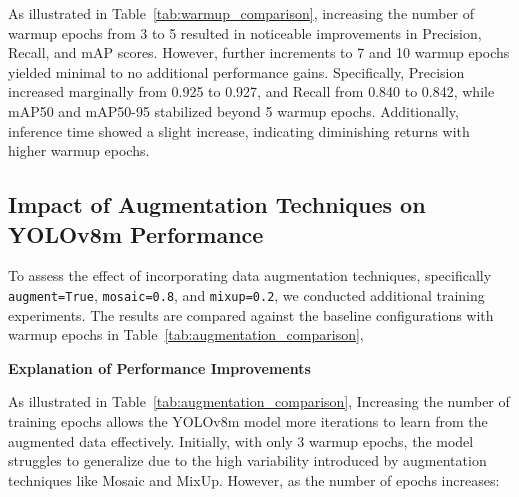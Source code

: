 \documentclass[conference]{IEEEtran}
\begin{document}
\vspace{0.5em} %

As illustrated in Table~\ref{tab:warmup_comparison}, increasing the number of warmup epochs from 3 to 5 resulted in noticeable improvements in Precision, Recall, and mAP scores. However, further increments to 7 and 10 warmup epochs yielded minimal to no additional performance gains. Specifically, Precision increased marginally from 0.925 to 0.927, and Recall from 0.840 to 0.842, while mAP50 and mAP50-95 stabilized beyond 5 warmup epochs. Additionally, inference time showed a slight increase, indicating diminishing returns with higher warmup epochs.

\subsection{Impact of Augmentation Techniques on YOLOv8m Performance}
To assess the effect of incorporating data augmentation techniques, specifically \texttt{augment=True}, \texttt{mosaic=0.8}, and \texttt{mixup=0.2}, we conducted additional training experiments. The results are compared against the baseline configurations with warmup epochs in Table~\ref{tab:augmentation_comparison},

\begin{table}[htbp]
    \centering
    \caption{Comparison of YOLOv8m Performance with Data Augmentation Across Different Epochs}
    \label{tab:augmentation_comparison}
\end{table}

\noindent \textbf{Explanation of Performance Improvements}

As illustrated in Table~\ref{tab:augmentation_comparison}, Increasing the number of training epochs allows the YOLOv8m model more iterations to learn from the augmented data effectively. Initially, with only 3 warmup epochs, the model struggles to generalize due to the high variability introduced by augmentation techniques like Mosaic and MixUp. However, as the number of epochs increases:
\end{document}
